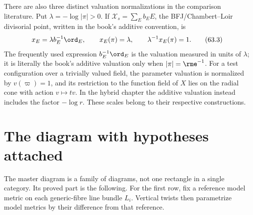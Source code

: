 There are also three distinct valuation normalizations in the comparison
literature. Put $\lambda=-\log|\pi|>0$. If
$\mathcal X_s=\sum_Eb_EE$, the BFJ/Chambert--Loir divisorial point,
written in the book's additive convention, is
\[
 x_E=\lambda b_E^{-1}\ord_E,\qquad x_E(\pi)=\lambda,
 \qquad \lambda^{-1}x_E(\pi)=1.
\tag{63.3}\label{eq:dict-nontrivial-divisorial-normalization}
\]
The frequently used expression $b_E^{-1}\ord_E$ is the valuation
measured in units of $\lambda$; it is literally the book's additive
valuation only when $|\pi|=\rme^{-1}$.
For a test configuration over a trivially valued field, the parameter
valuation is normalized by $v(\varpi)=1$, and its restriction to
the function field of $X$ lies on the radial cone with action
$v\mapsto tv$. In the hybrid chapter the additive valuation instead
includes the factor $-\log r$. These scales belong to their respective
constructions.

\section{The diagram with hypotheses attached}
\label{sec:dict-master}

The master diagram is a family of diagrams, not one rectangle in a single
category.
Its proved part is the following. For the first row, fix a reference
model metric on each generic-fibre line bundle $L_i$. Vertical twists
then parametrize model metrics by their difference from that reference.

